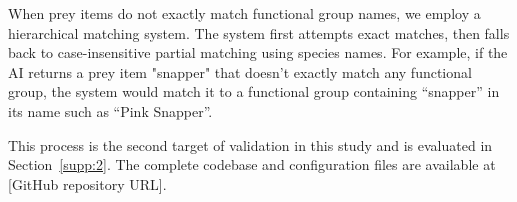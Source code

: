 When prey items do not exactly match functional group names, we employ a hierarchical matching system. The system first attempts exact matches, then falls back to case-insensitive partial matching using species names. For example, if the AI returns a prey item "snapper" that doesn't exactly match any functional group, the system would match it to a functional group containing ``snapper'' in its name such as ``Pink Snapper''.

This process is the second target of validation in this study and is evaluated in Section~\ref{supp:2}. The complete codebase and configuration files are available at [GitHub repository URL].
